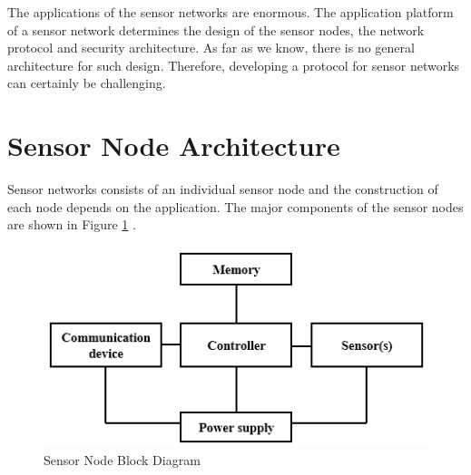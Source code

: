 \begin{description}
		
	\end{description}
	
	The applications of the sensor networks are enormous. 
	The application platform of a sensor network determines the design of the sensor nodes, the network protocol and security architecture.
	As far as we know, there is no general architecture for such design.
	Therefore, developing a protocol for sensor networks can certainly be challenging. 

\section{Sensor Node Architecture}
	Sensor networks consists of an individual sensor node and the construction of each node depends on the application.
	The major components of the sensor nodes are shown in Figure \ref{fig:sensor-node-architecture} \cite{karl2007protocols}.
	\begin{figure}[h!]
		\centering
		\includegraphics{images/sensor-node-architecture.png}
		\caption{Sensor Node Block Diagram}
		\label{fig:sensor-node-architecture}
	\end{figure}

